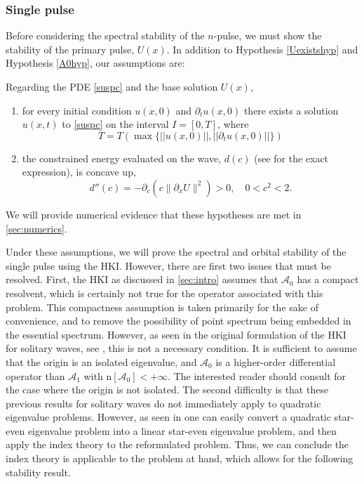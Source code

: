 \documentclass[review,onefignum,onetabnum]{siamart171218}
\newcommand{\rmn}{\mathrm{n}}
\newcommand{\calA}{\mathcal{A}}
\begin{document}
\subsubsection{Single pulse}

Before considering the spectral stability of the $n$-pulse, we must show the stability of the primary pulse, $U(x)$. In addition to Hypothesis \ref{Uexistshyp} and Hypothesis \ref{A0hyp}, our assumptions are:

\begin{hypothesis}\label{PDEexisthyp}
Regarding the PDE \cref{suspc} and the base solution $U(x)$,
\begin{enumerate}
  \item for every initial condition $u(x,0)$ and $\partial_tu(x,0)$ there exists a solution $u(x, t)$ to \cref{suspc} on the interval $I = [0, T]$, where
      \[
      T=T\left(\max\{ ||u(x,0)||, ||\partial_tu(x,0)|| \}\right)
      \]
  \item the constrained energy evaluated on the wave, $d(c)$ (see \cite[Equation~(2.16)]{grillakis:sto87} for the exact expression), is concave up,
\begin{equation}\label{dcc}
d''(c) = -\partial_c\left( c\|\partial_xU\|^2 \right)>0,\quad0<c^2<2.
\end{equation}
\end{enumerate}
\end{hypothesis}
We will provide numerical evidence that these hypotheses are met in \cref{sec:numerics}.

Under these assumptions, we will prove the spectral and orbital stability of the single pulse using the HKI. However, there are first two issues that must be resolved. First, the HKI as discussed in \cref{sec:intro} assumes that $\calA_0$ has a compact resolvent, which is certainly not true for the operator associated with this problem. This compactness assumption is taken primarily for the sake of convenience, and to remove the possibility of point spectrum being embedded in the essential spectrum. However, as seen in the original formulation of the HKI for solitary waves, see \cite{kapitula:cev04,kapitula:ace05}, this is not a necessary condition. It is sufficient to assume that the origin is an isolated eigenvalue, and $\calA_0$ is a higher-order differential operator than $\calA_1$ with $\rmn[\calA_0]<+\infty$.  The interested reader should consult \cite{kapitula:ahk14} for the case where the origin is not isolated.
The second difficulty is that these previous results for solitary waves do not immediately apply to quadratic eigenvalue problems.  However, as seen in \cite[Section~4.1]{bronski:aii14} one can easily convert a quadratic star-even eigenvalue problem into a linear star-even eigenvalue problem, and then apply the index theory to the reformulated problem. Thus, we can conclude the index theory is applicable to the problem at hand, which allows for the following stability result.
\end{document}
